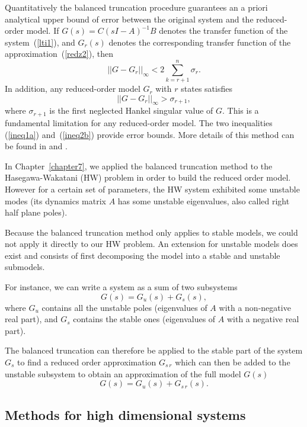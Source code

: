 \documentclass[12pt,lot, lof]{puthesis}
\begin{document}
Quantitatively the balanced truncation procedure guarantees an a priori analytical upper bound of error between the original system and the reduced-order model.  If $G(s)=C(sI-A)^{-1}B$ denotes the transfer function of the system~(\ref{lti1}), and $G_r(s)$ denotes the corresponding transfer function of the approximation~(\ref{redz2}), then 
\begin{equation}
\label{ineq1a}
|| G - G_r||_{\infty} < 2 \sum_{k= r+1} ^n \sigma_r.
\end{equation}
In addition, any reduced-order model $G_r$ with $r$ states satisfies 
 \begin{equation}
 \label{ineq2b}
|| G - G_r||_{\infty} > \sigma_{r+1},
\end{equation}
where $ \sigma_{r+1}$ is the first neglected Hankel singular value of $G$. This is a fundamental limitation for any reduced-order model. The two inequalities (\ref{ineq1a}) and~(\ref{ineq2b}) provide error bounds.
More details of this method can be found in \cite{Glover84} and \cite{SandP}.

In Chapter~\ref{chapter7}, we applied the balanced truncation method to the Hasegawa-Wakatani (HW) problem in order to build the reduced order model. However for a certain set of parameters, the HW system exhibited some unstable modes (its dynamics matrix $A$ has some unstable eigenvalues, also called right half plane poles).

Because the balanced truncation method only applies to stable models, we could not apply it directly to our HW problem. An extension for unstable models does exist and consists of first decomposing the model into a stable and unstable submodels.

For instance, we can write a system as a sum of two subsystems
\begin{equation}
G(s) = G_u(s)+ G_s(s),
\end{equation}
where $G_u$ contains all the unstable poles (eigenvalues of $A$ with a non-negative real part), and $G_s$ contains the stable ones (eigenvalues of $A$ with a negative real part).

The balanced truncation can therefore be applied to the stable part of the system $G_s$ to find a reduced order approximation $G_{s \, r}$
which can then be added to the unstable subsystem to obtain an approximation of the full model $G(s)$
\begin{equation}
G(s) = G_u(s)+ G_{s \, r}(s).
\end{equation}


\subsection{Methods for high dimensional systems}
\label{highdim}
\end{document}
